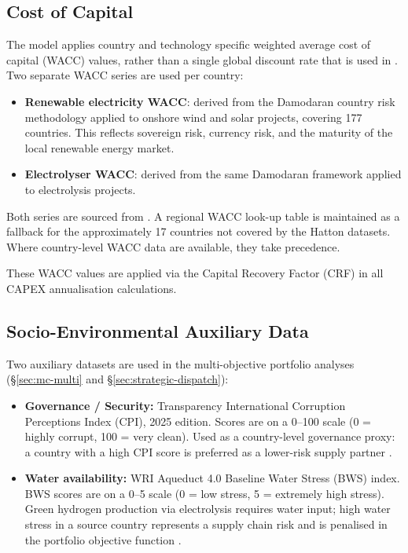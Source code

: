 \subsection{Cost of Capital}
\label{subsec:wacc}

The model applies country and technology specific weighted average cost of capital (WACC) values, rather than a single global discount rate that is used in \cite{Collis2022}. Two separate WACC series are used per country:

\begin{itemize}
    \item \textbf{Renewable electricity WACC}: derived from the Damodaran country risk methodology applied to onshore wind and solar projects, covering 177 countries. This reflects sovereign risk, currency risk, and the maturity of the local renewable energy market.
    \item \textbf{Electrolyser WACC}: derived from the same Damodaran framework applied to electrolysis projects.
\end{itemize}

Both series are sourced from \cite{Hatton2025}. A regional WACC look-up table is maintained as a fallback for the approximately 17 countries not covered by the Hatton datasets. Where country-level WACC data are available, they take precedence.

These WACC values are applied via the Capital Recovery Factor (CRF) in all CAPEX annualisation calculations.

\subsection{Socio-Environmental Auxiliary Data}

Two auxiliary datasets are used in the multi-objective portfolio analyses (\S\ref{sec:mc-multi} and \S\ref{sec:strategic-dispatch}):

\begin{itemize}
    \item \textbf{Governance / Security:} Transparency International Corruption Perceptions Index (CPI), 2025 edition. Scores are on a 0--100 scale (0 = highly corrupt, 100 = very clean). Used as a country-level governance proxy: a country with a high CPI score is preferred as a lower-risk supply partner \citep{CPI2025}.
    \item \textbf{Water availability:} WRI Aqueduct 4.0 Baseline Water Stress (BWS) index. BWS scores are on a 0--5 scale (0 = low stress, 5 = extremely high stress). Green hydrogen production via electrolysis requires water input; high water stress in a source country represents a supply chain risk and is penalised in the portfolio objective function \citep{wri2023}. 
\end{itemize}

